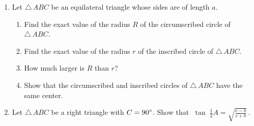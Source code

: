 {\begin{enumerate}[\bfseries 1.]
\begin{displaymath}
   rR ~=~ \frac{abc}{2\,(a+b+c)} ~~.
  \end{displaymath}
 \item Let $\triangle\,ABC$ be an equilateral triangle whose sides are of length $a$.
  \begin{enumerate}[\bfseries (a)]
   \item Find the exact value of the radius $R$ of the circumscribed circle of $\triangle\,ABC$.
   \item Find the exact value of the radius $r$ of the inscribed circle of $\triangle\,ABC$.
   \item How much larger is $R$ than $r$?
   \item Show that the circumscribed and inscribed circles of $\triangle\,ABC$ have the same center.
  \end{enumerate}
 \item Let $\triangle\,ABC$ be a right triangle with $C=90^\circ$. Show that
  $\;\tan\;\tfrac{1}{2}A = \sqrt{\frac{c-b}{c+b}}~$.
\end{enumerate}}
